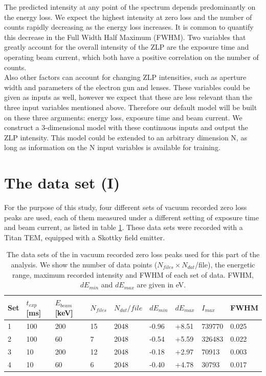 \documentclass[11pt,a4paper]{article}
\numberwithin{equation}{section}
\numberwithin{figure}{section}
\numberwithin{table}{section}
\begin{document}
The predicted intensity at any point of the spectrum depends predominantly on the energy loss. We expect the highest intensity at zero loss and the number of counts rapidly decreasing as the energy loss increases. It is common to quantify this decrease in the Full Width Half Maximum (FWHM). Two variables that greatly account for the overall intensity of the ZLP are the exposure time and operating beam current, which both have a positive correlation on the number of counts. \\
Also other factors can account for changing ZLP intensities, such as aperture width and parameters of the electron gun and lenses. These variables could be given as inputs as well, however we expect that these are less relevant than the three input variables mentioned above. Therefore our default model will be built on these three arguments: energy loss, exposure time and beam current. We construct a 3-dimensional model with these continuous inputs and output the ZLP intensity. This model could be extended to an arbitrary dimension N, as long as information on the N input variables is available for training.

\section{The data set (I)}
For the purpose of this study, four different sets of vacuum recorded zero loss peaks are used, each of them measured under a different setting of exposure time and beam current, as listed in table \ref{table:vacuum}. These data sets were recorded with a Titan TEM, equipped with a Skottky field emitter.


\begin{table}[H]
\begin{tabular}{|l|l|l|l|l|l|l|l|l|}
\hline
Set & $t_{exp}$ {[}ms{]} & $E_{beam}$ {[}keV{]} & $N_{files}$ & $N_{dat} / file$ & $dE_{min}$  & $dE_{max}$  & $I_{max}$ & FWHM  \\ \hline
1        & 100                 & 200                  & 15          & 2048               & -0.96              & +8.51               & 739770       & 0.025         \\
2        & 100                 & 60                   & 7           & 2048               & -0.54              & +5.59               & 326483       & 0.022         \\
3        & 10                  & 200                  & 12          & 2048               & -0.18              & +2.97               & 70913        & 0.003         \\
4        & 10                  & 60                   & 6           & 2048               & -0.40              & +4.78               & 30793        & 0.017         \\ \hline
\end{tabular}

\caption{The data sets of the in vacuum recorded zero loss peaks used for this part of the analysis. We show the number of data points ($N_{files}\times N_{dat}$/file), the energetic range, maximum recorded intensity and FWHM of each set of data. FWHM, $dE_{min}$ and $dE_{max}$ are given in eV.}
\label{table:vacuum}
\end{table}
\end{document}
